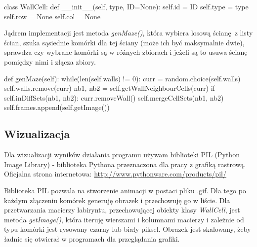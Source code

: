 \documentclass[12pt]{report}
\begin{document}
\begin{python}
class WallCell:
	def __init__(self, type, ID=None):
		self.id = ID
		self.type = type
		self.row = None
		self.col = None

\end{python}

\par Jądrem implementacji jest metoda \textit{genMaze()}, która wybiera
losową ścianę z listy ścian, szuka sąsiednie komórki dla tej ściany
(może ich być maksymalnie dwie), sprawdza czy wybrane komórki są w
różnych zbiorach i jeżeli są to usuwa ścianę pomiędzy nimi i złącza 
zbiory.

\begin{python}
	def genMaze(self):
		while(len(self.walls) != 0):
			curr = random.choice(self.walls)
			self.walls.remove(curr)
			nb1, nb2 = self.getWallNeighbourCells(curr)
			if self.inDiffSets(nb1, nb2):
				curr.removeWall()
				self.mergeCellSets(nb1, nb2)
				self.frames.append(self.getImage())
\end{python}

\subsection{Wizualizacja}
\par Dla wizualizacji wyników działania programu używam biblioteki PIL
(Python Image Library) - biblioteka Pythona przeznaczona dla pracy z 
grafiką rastrową. Oficjalna strona internetowa: 
\url{http://www.pythonware.com/products/pil/}
\par Biblioteka PIL pozwala na stworzenie animacji w postaci pliku .gif.
Dla tego po każdym złączeniu komórek generuję obrazek i przechowuję go
w liście. Dla przetwarzania macierzy labiryntu, przechowującej obiekty 
klasy \textit{WallCell}, jest metoda \textit{getImage()}, która iteruję
wierszami i kolumnami macierzy i zależnie od typu komórki jest 
rysowany czarny lub biały piksel. Obrazek jest skalowany, żeby
 ładnie się otwierał w programach dla przeglądania grafiki.
 \newpage






\begin{thebibliography}{9}

  

\end{thebibliography}
\end{document}

